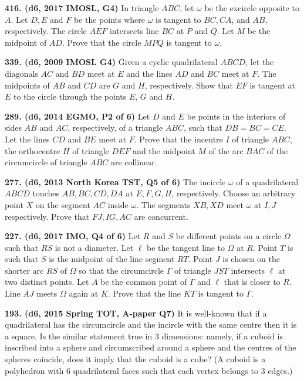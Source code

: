 \documentclass{article}
\begin{document}
\textbf{416. (\color{red}d6\color{black}, 2017 IMOSL, G4)} In triangle $ABC$, let $\omega$ be the excircle opposite to $A$. Let $D, E$ and $F$ be the points where $\omega$ is tangent to $BC, CA$, and $AB$, respectively. The circle $AEF$ intersects line $BC$ at $P$ and $Q$. Let $M$ be the midpoint of $AD$. Prove that the circle $MPQ$ is tangent to $\omega$.

\textbf{339. (\color{red}d6\color{black}, 2009 IMOSL G4)} Given a cyclic quadrilateral $ABCD$, let the diagonals $AC$ and $BD$ meet at $E$ and the lines $AD$ and $BC$ meet at $F$. The midpoints of $AB$ and $CD$ are $G$ and $H$, respectively. Show that $EF$ is tangent at $E$ to the circle through the points $E$, $G$ and $H$.

\textbf{289. (\color{red}d6\color{black}, 2014 EGMO, P2 of 6)} Let $D$ and $E$ be points in the interiors of sides $AB$ and $AC$, respectively, of a triangle $ABC$, such that $DB = BC = CE.$ Let the lines $CD$ and $BE$ meet at $F.$ Prove that the incentre $I$ of triangle $ABC$, the orthocentre $H$ of triangle $DEF$ and the midpoint $M$ of the arc $BAC$ of the circumcircle of triangle $ABC$ are collinear.

\textbf{277. (\color{red}d6\color{black}, 2013 North Korea TST, Q5 of 6)} The incircle $ \omega $ of a quadrilateral $ ABCD $ touches $ AB, BC, CD, DA $ at $ E, F, G, H $, respectively. Choose an arbitrary point $  X$ on the segment $ AC $ inside $ \omega $. The segments $ XB, XD $ meet $ \omega $ at $ I, J $ respectively. Prove that $ FJ, IG, AC $ are concurrent.

\textbf{227. (\color{red}d6\color{black}, 2017 IMO, Q4 of 6)} Let \(R\) and \(S\) be different points on a circle \(\Omega\) such that \(RS\) is not a diameter. Let \(\ell\) be the tangent line to \(\Omega\) at \(R\). Point \(T\) is such that \(S\) is the midpoint of the line segment \(RT\). Point \(J\) is chosen on the shorter arc \(RS\) of \(\Omega\) so that the circumcircle \(\Gamma\) of triangle \(JST\) intersects \(\ell\) at two distinct points. Let \(A\) be the common point of \(\Gamma\) and \(\ell\) that is closer to \(R\). Line \(AJ\) meets \(\Omega\) again at \(K\). Prove that the line \(KT\) is tangent to \(\Gamma\).

\textbf{193. (\color{red}d6\color{black}, 2015 Spring TOT, A-paper Q7)} It is well-known that if a quadrilateral has the circumcircle and the incircle with the same centre then it is a square. Is the similar statement true in 3 dimensions: namely, if a cuboid is inscribed into a sphere and circumscribed around a sphere and the centres of the spheres coincide, does it imply that the cuboid is a cube? (A cuboid is a polyhedron with 6 quadrilateral faces such that each vertex belongs to $3$ edges.)
\end{document}
